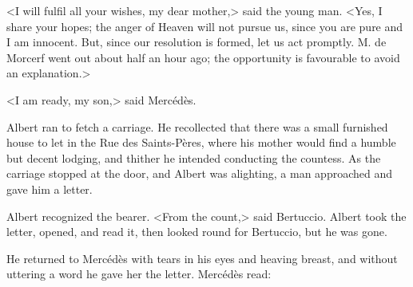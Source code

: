  <I will fulfil all your wishes, my dear mother,> said the young man. <Yes, I share your hopes; the anger of Heaven will not pursue us, since you are pure and I am innocent. But, since our resolution is formed, let us act promptly. M. de Morcerf went out about half an hour ago; the opportunity is favourable to avoid an explanation.> 

 <I am ready, my son,> said Mercédès. 

 Albert ran to fetch a carriage. He recollected that there was a small furnished house to let in the Rue des Saints-Pères, where his mother would find a humble but decent lodging, and thither he intended conducting the countess. As the carriage stopped at the door, and Albert was alighting, a man approached and gave him a letter. 

 Albert recognized the bearer. <From the count,> said Bertuccio. Albert took the letter, opened, and read it, then looked round for Bertuccio, but he was gone. 

 He returned to Mercédès with tears in his eyes and heaving breast, and without uttering a word he gave her the letter. Mercédès read: 

